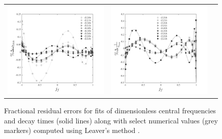 \documentclass[twocolumn,aps,prd,floatfix,preprintnumbers,a4paper,nofootinbib,
superscriptaddress,10pt]{revtex4-1}
\begin{document}
%
\begin{figure}
  \begin{tabular}{lcr}
    \includegraphics[width=\figfactor\textwidth]{fig/res_w.pdf} & \includegraphics[width=\figfactor\textwidth]{fig/res_tau.pdf}
  \end{tabular}
	\caption{ Fractional residual errors for fits of dimensionless \qnm{} central frequencies and decay times (solid lines) along with select numerical values (grey markers) computed using Leaver's method \cite{Leaver85}. }
  \label{fig:qnm_err}
\end{figure}
\end{document}
